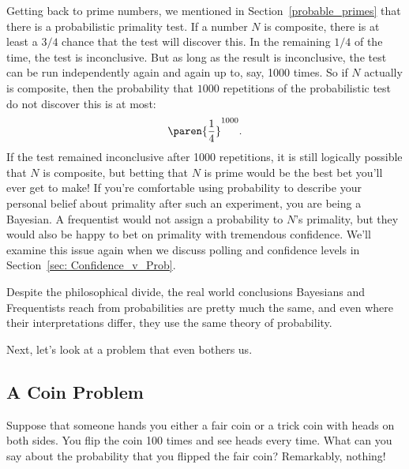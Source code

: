 Getting back to prime numbers, we mentioned in
Section~\ref{probable_primes} that there is a probabilistic primality
test.  If a number $N$ is composite, there is at least a $3/4$ chance
that the test will discover this.  In the remaining $1/4$ of the time,
the test is inconclusive.  But as long as the result is inconclusive,
the test can be run independently again and again up to, say, 1000
times.  So if $N$ actually is composite, then the probability that
$1000$ repetitions of the probabilistic test do not discover this is
at most:
\[
\paren{\frac{1}{4}}^{1000}.
\]
If the test remained inconclusive after 1000 repetitions, it is still
logically possible that $N$ is composite, but betting that $N$ is
prime would be the best bet you'll ever get to make!  If you're
comfortable using probability to describe your personal belief about
primality after such an experiment, you are being a Bayesian.  A
frequentist would not assign a probability to $N$'s primality, but
they would also be happy to bet on primality with tremendous
confidence.  We'll examine this issue again when we discuss polling
and confidence levels in Section~\ref{sec: Confidence_v_Prob}.

Despite the philosophical divide, the real world conclusions Bayesians
and Frequentists reach from probabilities are pretty much the same,
and even where their interpretations differ, they use the same theory
of probability.

\iffalse

Next, let's look at a problem that even bothers us.

\subsection{A Coin Problem}

Suppose that someone hands you either a fair coin or a trick coin with
heads on both sides.  You flip the coin 100 times and see heads every
time.  What can you say about the probability that you flipped the
fair coin?  Remarkably, nothing!

